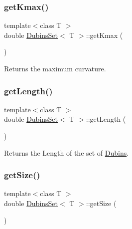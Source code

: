 \subsubsection{\texorpdfstring{getKmax()}{getKmax()}}
{\footnotesize\ttfamily template$<$class T $>$ \\
double \mbox{\hyperlink{class_dubins_set}{Dubins\+Set}}$<$ T $>$\+::get\+Kmax (\begin{DoxyParamCaption}{ }\end{DoxyParamCaption})\hspace{0.3cm}{\ttfamily [inline]}}



Returns the maximum curvature. 

\mbox{\label{class_dubins_set_ad491b5f7e71c3db5ffed11643d2d4e4c}} 
\subsubsection{\texorpdfstring{getLength()}{getLength()}}
{\footnotesize\ttfamily template$<$class T $>$ \\
double \mbox{\hyperlink{class_dubins_set}{Dubins\+Set}}$<$ T $>$\+::get\+Length (\begin{DoxyParamCaption}{ }\end{DoxyParamCaption})\hspace{0.3cm}{\ttfamily [inline]}}



Returns the Length of the set of {\ttfamily \mbox{\hyperlink{class_dubins}{Dubins}}}. 

\mbox{\label{class_dubins_set_a41f7dbb6b82c8822e427ee1a3059b8ca}} 
\subsubsection{\texorpdfstring{getSize()}{getSize()}}
{\footnotesize\ttfamily template$<$class T $>$ \\
double \mbox{\hyperlink{class_dubins_set}{Dubins\+Set}}$<$ T $>$\+::get\+Size (\begin{DoxyParamCaption}{ }\end{DoxyParamCaption})\hspace{0.3cm}{\ttfamily [inline]}}



